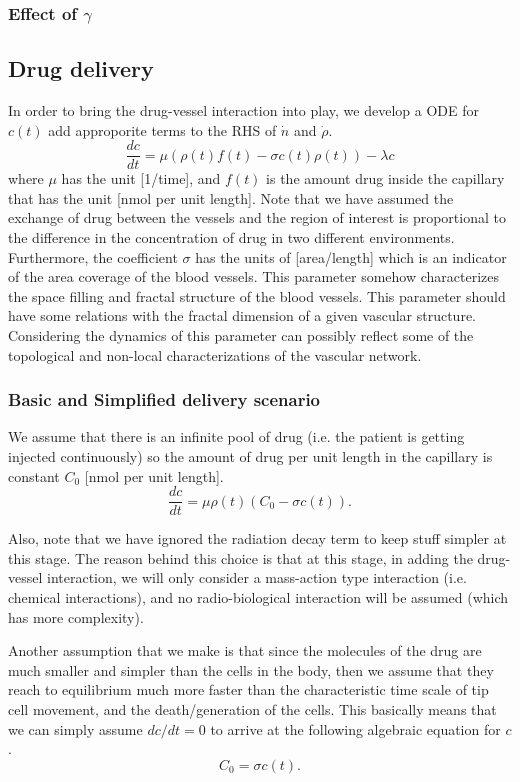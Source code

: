 \FloatBarrier

\subsubsection*{Effect of $\gamma$}




\subsection*{Drug delivery}
In order to bring the drug-vessel interaction into play, we develop a ODE for $c(t)$ add approporite terms to the RHS of $\dot{n}$ and $\dot{\rho}$.
\[ \frac{dc}{dt} = \mu (\rho(t)f(t) - \sigma c(t)\rho(t)) - \boxed{\lambda c} \]
where $\mu$ has the unit [1/time], and $f(t)$ is the amount drug inside the capillary that has the unit [nmol per unit length]. Note that we have assumed the exchange of drug between the vessels and the region of interest is proportional to the difference in the concentration of drug in two different environments. Furthermore, the coefficient $\sigma$ has the units of [area/length] which is an indicator of the area coverage of the blood vessels. This parameter somehow characterizes the space filling and fractal structure of the blood vessels. This parameter should have some relations with the fractal dimension of a given vascular structure. Considering the dynamics of this parameter can possibly reflect some of the topological and non-local characterizations of the vascular network.



\subsubsection*{Basic and Simplified delivery scenario}
We assume that there is an infinite pool of drug (i.e. the patient is getting injected continuously) so the amount of drug per unit length in the capillary is constant $C_0$ [nmol per unit length].
\[ \frac{dc}{dt} = \mu \rho(t)(C_0 - \sigma c(t)).  \]

Also, note that we have ignored the radiation decay term to keep stuff simpler at this stage. The reason behind this choice is that at this stage, in adding the drug-vessel interaction, we will only consider a mass-action type interaction (i.e. chemical interactions), and no radio-biological interaction will be assumed (which has more complexity).

Another assumption that we make is that since the molecules of the drug are much smaller and simpler than the cells in the body, then we assume that they reach to equilibrium much more faster than the characteristic time scale of tip cell movement, and the death/generation of the cells. This basically means that we can simply assume $dc/dt=0$ to arrive at the following algebraic equation for $c$.
\[ C_0 = \sigma c(t). \]




